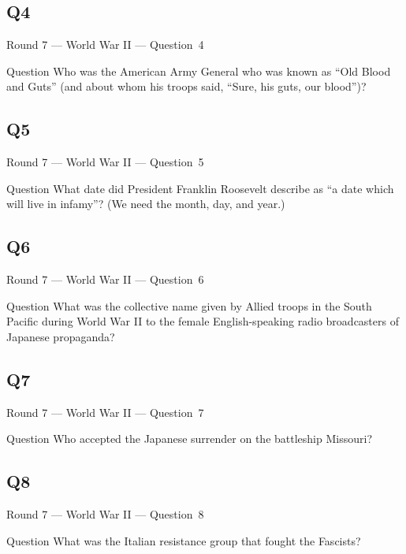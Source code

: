 \documentclass[11pt]{beamer}
\begin{document}
\subsection*{Q4}
\begin{frame}[t]{Round 7 --- World War II --- \mbox{Question 4}}
\vspace{-0.5em}
\begin{block}{Question}
Who was the American Army General who was known as ``Old Blood and Guts'' (and about whom his troops said, ``Sure, his guts, our blood'')?
\end{block}
\end{frame}
\subsection*{Q5}
\begin{frame}[t]{Round 7 --- World War II --- \mbox{Question 5}}
\vspace{-0.5em}
\begin{block}{Question}
What date did President Franklin Roosevelt describe as ``a date which will live in infamy''? (We need the month, day, and year.)
\end{block}
\end{frame}
\subsection*{Q6}
\begin{frame}[t]{Round 7 --- World War II --- \mbox{Question 6}}
\vspace{-0.5em}
\begin{block}{Question}
What was the collective name given by Allied troops in the South Pacific during World War II to the female English-speaking radio broadcasters of Japanese propaganda?
\end{block}
\end{frame}
\subsection*{Q7}
\begin{frame}[t]{Round 7 --- World War II --- \mbox{Question 7}}
\vspace{-0.5em}
\begin{block}{Question}
Who accepted the Japanese surrender on the battleship Missouri?
\end{block}
\end{frame}
\subsection*{Q8}
\begin{frame}[t]{Round 7 --- World War II --- \mbox{Question 8}}
\vspace{-0.5em}
\begin{block}{Question}
What was the Italian resistance group that fought the Fascists?
\end{block}
\end{frame}
\end{document}
